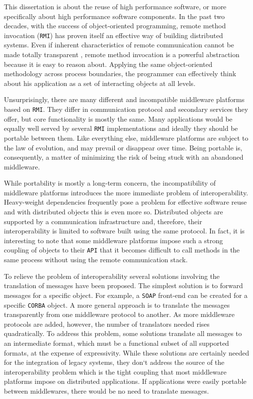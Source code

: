 This dissertation is about the reuse of high performance software, or more specifically about
high performance software components. In the past two decades, with the success of object-oriented
programming, remote method invocation (\texttt{RMI}) has proven itself an effective way of building
distributed systems. Even if inherent characteristics of remote communication cannot be made totally
transparent \cite{Kendall}, remote method invocation is a powerful abstraction because it is easy to
reason about. Applying the same object-oriented methodology across process boundaries, the programmer
can effectively think about his application as a set of interacting objects at all levels.

Unsurprisingly, there are many different and incompatible middleware platforms based on \texttt{RMI}.
They differ in communication protocol and secondary services they offer, but core functionality is mostly
the same. Many applications would be equally well served by several \texttt{RMI} implementations and
ideally they should be portable between them. Like everything else, middleware platforms are subject to
the law of evolution, and may prevail or disappear over time. Being portable is, consequently, a matter of
minimizing the risk of being stuck with an abandoned middleware.

While portability is mostly a long-term concern, the incompatibility of middleware platforms introduces
the more immediate problem of interoperability. Heavy-weight dependencies frequently pose a problem
for effective software reuse and with distributed objects this is even more so. Distributed objects are supported
by a communication infrastructure and, therefore, their interoperability is limited to software built using the
same protocol. In fact, it is interesting to note that some middleware platforms impose such a strong coupling of objects to
their \texttt{API} that it becomes difficult to call methods in the same process without using the remote communication stack.

To relieve the problem of interoperability several solutions involving the translation of messages have been
proposed. The simplest solution is to forward messages for a specific object. For example, a \texttt{SOAP} front-end can
be created for a specific \texttt{CORBA} object. A more general approach is to translate the messages transparently
from one middleware protocol to another. As more middleware protocols are added, however, the number of translators
needed rises quadratically. To address this problem, some solutions translate all messages to an intermediate format,
which must be a functional subset of all supported formats, at the expense of expressivity. While these solutions
are certainly needed for the integration of legacy systems, they don`t address the source of the interoperability
problem which is the tight coupling that most middleware platforms impose on distributed applications. If applications were
easily portable between middlewares, there would be no need to translate messages.

